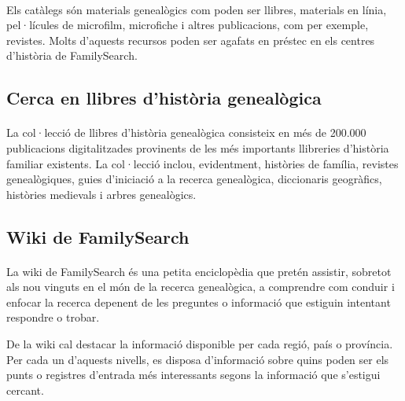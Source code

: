         \paragraph{}
        Els catàlegs són materials genealògics com poden ser llibres, materials en línia, pel·lícules de microfilm, microfiche i altres publicacions, com per exemple, revistes. Molts d’aquests recursos poden ser agafats en préstec en els centres d’història de FamilySearch.


    \subsection{Cerca en llibres d'història genealògica}

        \paragraph{}
        La col·lecció de llibres d’història genealògica consisteix en més de 200.000 publicacions digitalitzades provinents de les més importants llibreries d’història familiar existents. La col·lecció inclou, evidentment, històries de família, revistes genealògiques, guies d’iniciació a la recerca genealògica, diccionaris geogràfics, històries medievals i arbres genealògics.


    \subsection{Wiki de FamilySearch}

        \paragraph{}
        La wiki de FamilySearch és una petita enciclopèdia que pretén assistir, sobretot als nou vinguts en el món de la recerca genealògica, a comprendre com conduir i enfocar la recerca depenent de les preguntes o informació que estiguin intentant respondre o trobar.

        De la wiki cal destacar la informació disponible per cada regió, país o província. Per cada un d'aquests nivells, es disposa d'informació sobre quins poden ser els punts o registres d’entrada més interessants segons la informació que s'estigui cercant.
